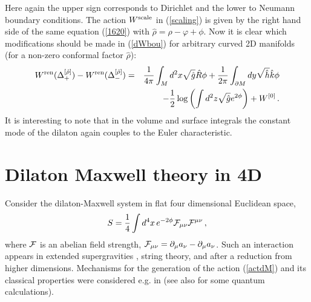 \documentclass[a4paper,12pt]{article}
\begin{document}
Here again the upper sign corresponds to Dirichlet and the lower
to Neumann boundary conditions. The action $W^{\mbox{\scriptsize scale}}$
in (\ref{scaling}) is given by the right hand side of the same equation
(\ref{1620}) with $\hat \rho =\rho -\varphi +\phi$. 
Now it is clear which modifications
should be made in (\ref{dWbou}) for arbitrary curved 2D manifolds 
(for a non-zero conformal factor
$\hat\rho$):
\begin{eqnarray}
W^{\mbox{\scriptsize ren}}(\Delta^{[\hat \rho]}_+)-
W^{\mbox{\scriptsize ren}}(\Delta^{[\hat \rho]}_-)&=&
\frac 1{4\pi} \int_M d^2x \sqrt{\hat g} \hat R \phi 
+\frac 1{2\pi }
\int_{\partial M} dy\sqrt{\hat h}  \hat k\phi \nonumber \\
&&-\frac 12 \log \left( \int d^2z
\sqrt{\hat g}e^{2\phi} \right) +W^{[0]} \,. \label{dWbour}
\end{eqnarray}
It is interesting to note that in the volume and surface integrals
the constant mode of the dilaton again couples to the Euler
characteristic.

\section{Dilaton Maxwell theory in 4D}
Consider the dilaton-Maxwell system in flat four dimensional
Euclidean space, 
\begin{equation}
S=\frac 14 \int d^4 x \, e^{-2\phi}
{\cal F}_{\mu\nu}{\cal F}^{\mu\nu} \,, \label{actdM}
\end{equation}
where ${\cal F}$ is an abelian field strength,
${\cal F}_{\mu\nu}=\partial_\mu a_\nu -\partial_\mu a_\nu$.
Such an interaction appears in extended supergravities \cite{Cremmer78},
string theory, and after a reduction from higher dimensions.
Mechanisms for the generation of the action (\ref{actdM}) and its
classical properties were considered e.g. in
\cite{Gibbons82,Maeda86,Frolov87,Gibbons88,Garfinkle91,Horowitz:1991cd}
(see also \cite{no98,odi98,io98} for
some quantum calculations).
\end{document}
